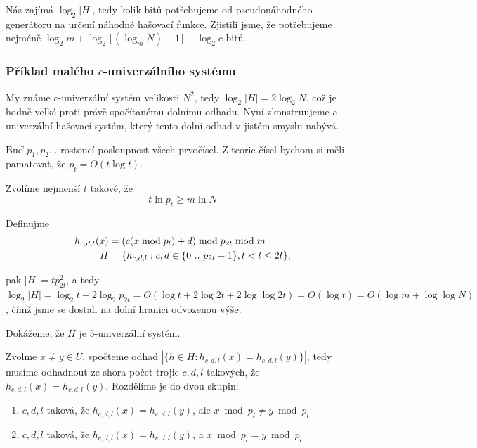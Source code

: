 Nás zajímá $\log_2 |H|$, tedy kolik bitů potřebujeme od
pseudonáhodného generátoru na určení náhodné hašovací funkce. Zjistili
jsme, že potřebujeme nejméně
\( \log_2 m + \log_2 \lceil(\log_m N)-1\rceil -\log_2 c \) bitů.

\subsubsection{Příklad malého $c$-univerzálního systému}

My známe \( c \)-univerzální systém velikosti \( N^{2} \),
tedy \( \log _{2}|H|=2\log _{2}N \), což je hodně velké 
proti právě spočítanému dolnímu odhadu. Nyní zkonstruujeme $c$-univerzální 
hašovací systém, který tento dolní odhad v jistém smyslu nabývá.

Buď \( p_{1},p_{2}\ldots \) rostoucí posloupnost všech prvočísel. Z
teorie čísel bychom si měli pamatovat, že $p_t = O(t \log t)$.

Zvolíme nejmenší \( t \) takové, že 
\begin{equation}
\label{deft}
t \ln p_{t}  \geq m \ln N
\end{equation}

Definujme
\begin{align}
h_{c,d,l}(x) &  = \left( c (x \bmod p_l) + d \right) \bmod p_{2t} \bmod m\\
H & = \{ h_{c,d,l} : c,d \in \{{0}\ ..\ {p_{2t}-1}\}, t < l \leq 2t \},
\end{align}

pak \( |H|=t p_{2t}^2 \), a tedy 
$\log_2 |H| = \log_2 t + 2 \log_2 p_{2t} 
= O( \log t + 2 \log 2t + 2 \log\log 2t)
= O(\log t)
= O(\log m + \log \log N)$, čímž jsme se dostali na dolní hranici
odvozenou výše.

Dokážeme, že $H$ je 5-univerzální systém.

Zvolme \( x\neq y\in U\), spočteme odhad 
\( |\{ h\in H : h_{c,d,l}(x) = h_{c,d,l}(y) \}|  \),
tedy musíme odhadnout ze shora počet trojic $c, d, l$ takových, že 
$h_{c,d,l}(x)=h_{c,d,l}(y)$.
Rozdělíme je do dvou skupin:

\begin{enumerate}
\item $c,d,l$ taková, že $h_{c,d,l}(x) = h_{c,d,l}(y)$,
ale $x \bmod p_l \neq y \bmod p_l$
\item $c,d,l$ taková, že $h_{c,d,l}(x) = h_{c,d,l}(y)$,
a $x \bmod p_l = y \bmod p_l$
\end{enumerate}

